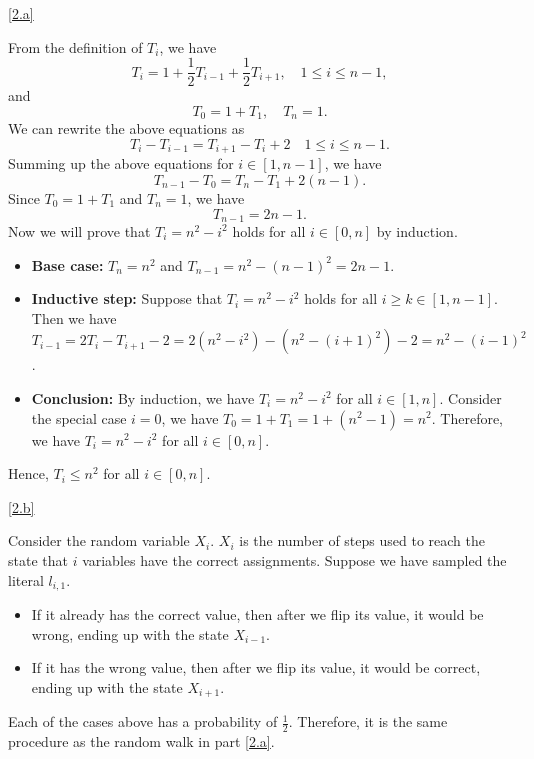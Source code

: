 \documentclass{homework}
\begin{document}
\begin{solution}

  \ref{2.a}

  From the definition of $T_{i}$, we have
  \begin{equation*}
    T_{i} = 1 + \frac{1}{2}T_{i-1} + \frac{1}{2}T_{i+1}, \quad 1 \le i \le n - 1,
  \end{equation*}
  and
  \begin{equation*}
    T_{0} = 1 + T_{1}, \quad T_{n} = 1.
  \end{equation*}
  We can rewrite the above equations as
  \begin{equation*}
    T_{i} - T_{i-1} = T_{i+1} - T_{i} + 2 \quad 1 \le i \le n - 1.
  \end{equation*}
  Summing up the above equations for $i \in [1, n - 1]$, we have
  \begin{equation*}
    T_{n-1} - T_{0} = T_{n} - T_{1} + 2(n-1).
  \end{equation*}
  Since $T_{0} = 1 + T_{1}$ and $T_{n} = 1$, we have
  \begin{equation*}
    T_{n-1} = 2n-1.
  \end{equation*}
  Now we will prove that $T_{i} = n^2 - i^2$ holds for all $i \in [0, n]$ by induction.

  \begin{itemize}
    \item \textbf{Base case:} $T_{n} = n^2$ and $T_{n - 1} = n^2 - (n - 1)^2 = 2n - 1$.
    \item \textbf{Inductive step:} Suppose that $T_{i} = n^2 - i^2$ holds for
          all $i \ge k \in [1, n - 1]$.
    Then we have $T_{i - 1} = 2T_i - T_{i + 1} - 2 = 2(n^2 - i^2) - (n^2 - (i + 1)^2) - 2 = n^2 - (i - 1)^2$.
    \item \textbf{Conclusion:} By induction, we have $T_{i} = n^2 - i^2$ for all $i \in [1, n]$.
          Consider the special case $i = 0$, we have $T_{0} = 1 + T_{1} = 1 + (n^2 - 1) = n^2$.
          Therefore, we have $T_{i} = n^2 - i^2$ for all $i \in [0, n]$.
  \end{itemize}
  Hence, $T_{i} \le n^2$ for all $i \in [0, n]$.

  \ref{2.b}

  Consider the random variable $X_i$. $X_i$ is the number of steps used to
  reach the state that $i$ variables have the correct assignments.
  Suppose we have sampled the literal $l_{i, 1}$.
  \begin{itemize}
    \item If it already has the correct value, then after we flip its value,
          it would be wrong, ending up with the state $X_{i - 1}$.
    \item If it has the wrong value, then after we flip its value,
          it would be correct, ending up with the state $X_{i + 1}$.
  \end{itemize}
  Each of the cases above has a probability of $\frac{1}{2}$.
  Therefore, it is the same procedure as the random walk in part \ref{2.a}.
  

\end{solution}
\end{document}
